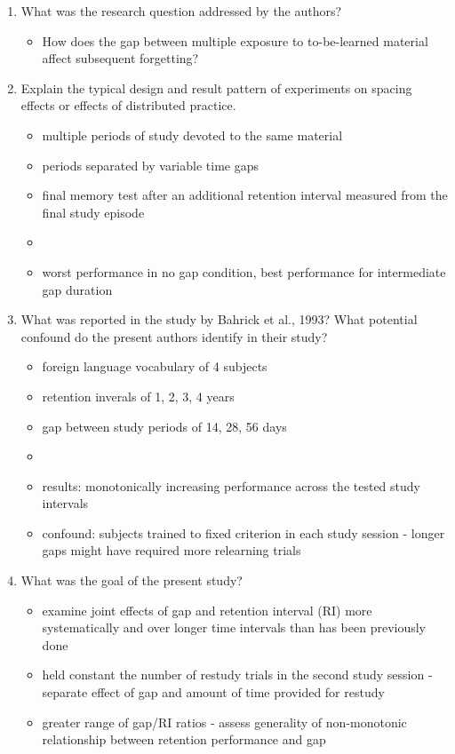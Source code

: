 \documentclass[12pt,english]{scrartcl}
\begin{document}
\begin{enumerate}
 \item What was the research question addressed by the authors?

 \color{blue}
 \begin{itemize}
 \item How does the gap between multiple exposure to to-be-learned material affect subsequent forgetting?
 \end{itemize}
  \color{black}

 \item Explain the typical design and result pattern of experiments on spacing effects or effects of distributed practice.

 \color{blue}
 \begin{itemize}
 \item multiple periods of study devoted to the same material
 \item periods separated by variable time gaps
 \item final memory test after an additional retention interval measured from the final study episode
 \item[]
 \item worst performance in no gap condition, best performance for intermediate gap duration  
 \end{itemize}
  \color{black}

 \item What was reported in the study by Bahrick et al., 1993? What potential confound do the present authors identify in their study?
 
\color{blue}
 \begin{itemize}
 \item foreign language vocabulary of 4 subjects
 \item retention inverals of 1, 2, 3, 4 years
 \item gap between study periods of 14, 28, 56 days
 \item[]
 \item results: monotonically increasing performance across the tested study intervals 
 \item confound: subjects trained to fixed criterion in each study session - longer gaps might have required more relearning trials
 \end{itemize}
  \color{black}

 \item What was the goal of the present study?

 \color{blue}
 \begin{itemize}
 \item examine joint effects of gap and retention interval (RI) more systematically and over longer time intervals than has been previously done
 \item held constant the number of restudy trials in the second study session - separate effect of gap and amount of time provided for restudy
 \item greater range of gap/RI ratios - assess generality of non-monotonic relationship between retention performance and gap
\end{itemize}
  \color{black}



\end{enumerate}
\end{document}
